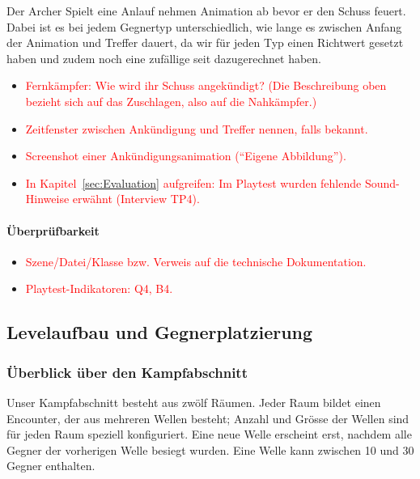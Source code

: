 \documentclass[../Main.tex]{subfiles}
\begin{document}
Der Archer Spielt eine Anlauf nehmen Animation ab bevor er den Schuss feuert. Dabei ist es bei jedem Gegnertyp unterschiedlich, wie lange es zwischen Anfang der Animation und Treffer dauert, da wir für jeden Typ einen Richtwert gesetzt haben und zudem noch eine zufällige seit dazugerechnet haben.

\begin{itemize}[leftmargin=1.5cm]
    \item \textcolor{red}{Fernkämpfer: Wie wird ihr Schuss angekündigt? (Die Beschreibung oben bezieht sich auf das Zuschlagen, also auf die Nahkämpfer.)}
    \item \textcolor{red}{Zeitfenster zwischen Ankündigung und Treffer nennen, falls bekannt.}
    \item \textcolor{red}{Screenshot einer Ankündigungsanimation (\enquote{Eigene Abbildung}).}
    \item \textcolor{red}{In Kapitel~\ref{sec:Evaluation} aufgreifen: Im Playtest wurden fehlende Sound-Hinweise erwähnt (Interview TP4).}
\end{itemize}

\paragraph{Überprüfbarkeit}
\begin{itemize}[leftmargin=1.5cm]
    \item \textcolor{red}{Szene/Datei/Klasse bzw. Verweis auf die technische Dokumentation.}
    \item \textcolor{red}{Playtest-Indikatoren: Q4, B4.}
\end{itemize}

\subsection{Levelaufbau und Gegnerplatzierung} \label{sec:UmsetzungLevel}

\subsubsection{Überblick über den Kampfabschnitt} \label{sec:Kampfabschnitt}

Unser Kampfabschnitt besteht aus zwölf Räumen. Jeder Raum bildet einen Encounter, der aus mehreren Wellen besteht; Anzahl und Grösse der Wellen sind für jeden Raum speziell konfiguriert. Eine neue Welle erscheint erst, nachdem alle Gegner der vorherigen Welle besiegt wurden. Eine Welle kann zwischen 10 und 30 Gegner enthalten.
\end{document}
